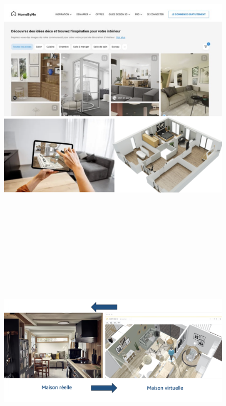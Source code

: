 \documentclass{ENSEIRB_poster}
\begin{document}
\begin{frame}[t]
\begin{columns}[t]
    \begin{column}{\twocolwidth}
    \begin{figure}
        \includegraphics[width=\textwidth, height=15cm]{templateLatex/logos/HomeByMe.png}
      \end{figure}
      \begin{figure}
        \includegraphics[width=\textwidth, height=10cm]{templateLatex/logos/Jumeau virtuel.png}
      \end{figure}
        

\end{column}
\end{columns}
\end{frame}
\end{document}
